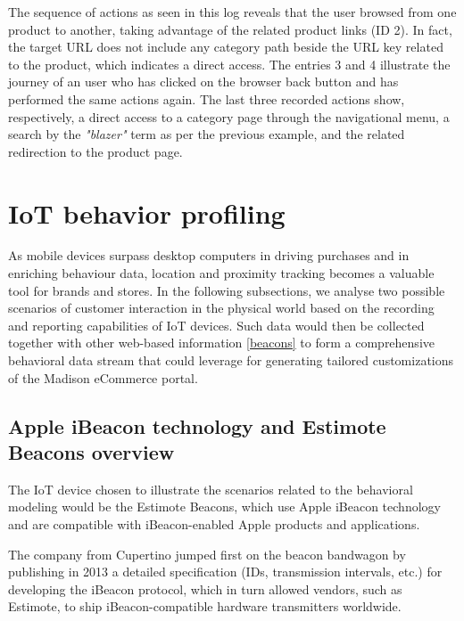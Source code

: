 The sequence of actions as seen in this log reveals that the user browsed from one product to another, taking advantage of the related product links (ID 2). In fact, the target URL does not include any category path beside the URL key related to the product, which indicates a direct access. The entries 3 and 4 illustrate the journey of an user who has clicked on the browser back button and has performed the same actions again. The last three recorded actions show, respectively, a direct access to a category page through the navigational menu, a search by the \textit{"blazer"} term as per the previous example, and the related redirection to the product page.

\newpage
\section{IoT behavior profiling}

As mobile devices surpass desktop computers in driving purchases and in enriching behaviour data, location and proximity tracking becomes a valuable tool for brands and stores. In the following subsections, we analyse two possible scenarios of customer interaction in the physical world based on the recording and reporting capabilities of IoT devices. Such data would then be collected together with other web-based information \ref{beacons} to form a comprehensive behavioral data stream that could leverage for generating tailored customizations of the Madison eCommerce portal.

\subsection{Apple iBeacon technology and Estimote Beacons overview}

The IoT device chosen to illustrate the scenarios related to the behavioral modeling would be the Estimote Beacons, which use Apple iBeacon technology and are compatible with iBeacon-enabled Apple products and applications.

The company from Cupertino jumped first on the beacon bandwagon by publishing in 2013 a detailed specification (IDs, transmission intervals, etc.) for developing the iBeacon protocol, which in turn allowed vendors, such as Estimote, to ship iBeacon-compatible hardware transmitters worldwide.

